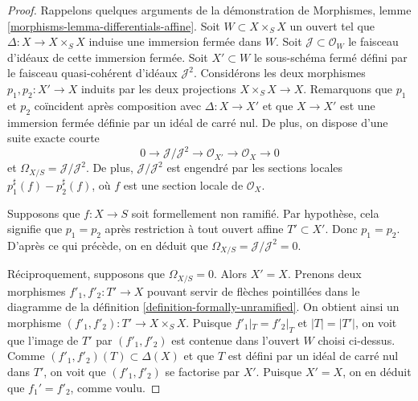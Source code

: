 \begin{proof}
Rappelons quelques arguments de la démonstration de
Morphismes, lemme \ref{morphisms-lemma-differentials-affine}.
Soit $W \subset X \times_S X$ un ouvert tel que
$\Delta : X \to X \times_S X$ induise une immersion fermée dans $W$.
Soit $\mathcal{J} \subset \mathcal{O}_W$ le faisceau d'idéaux de cette
immersion fermée. Soit $X' \subset W$ le sous-schéma fermé
défini par le faisceau quasi-cohérent d'idéaux $\mathcal{J}^2$.
Considérons les deux morphismes $p_1, p_2 : X' \to X$ induits par
les deux projections $X \times_S X \to X$.
Remarquons que $p_1$ et $p_2$ coïncident après composition avec $\Delta : X \to X'$
et que $X \to X'$ est une immersion fermée définie par un idéal
de carré nul. De plus, on dispose d'une suite exacte courte
$$
0 \to \mathcal{J}/\mathcal{J}^2 \to \mathcal{O}_{X'} \to \mathcal{O}_X \to 0
$$
et $\Omega_{X/S} = \mathcal{J}/\mathcal{J}^2$. De plus,
$\mathcal{J}/\mathcal{J}^2$ est engendré par les sections
locales $p_1^\sharp(f) - p_2^\sharp(f)$, où $f$ est une section locale de
$\mathcal{O}_X$.

\medskip\noindent
Supposons que $f : X \to S$ soit formellement non ramifié.
Par hypothèse, cela signifie que $p_1 = p_2$ après restriction à tout
ouvert affine $T' \subset X'$. Donc $p_1 = p_2$. D'après ce qui précède,
on en déduit que $\Omega_{X/S} = \mathcal{J}/\mathcal{J}^2 = 0$.

\medskip\noindent
Réciproquement, supposons que $\Omega_{X/S} = 0$. Alors $X' = X$. Prenons deux
morphismes $f'_1, f'_2 : T' \to X$ pouvant servir de flèches pointillées dans
le diagramme de
la définition \ref{definition-formally-unramified}.
On obtient ainsi un morphisme $(f'_1, f'_2) : T' \to X \times_S X$.
Puisque $f'_1|_T = f'_2|_T$ et $|T| =|T'|$, on voit que l'image de $T'$
par $(f'_1, f'_2)$ est contenue dans l'ouvert $W$ choisi ci-dessus. Comme
$(f'_1, f'_2)(T) \subset \Delta(X)$ et que $T$ est défini par un idéal
de carré nul dans $T'$, on voit que $(f'_1, f'_2)$ se factorise par $X'$.
Puisque $X' = X$, on en déduit que $f_1' = f'_2$, comme voulu.
\end{proof}

